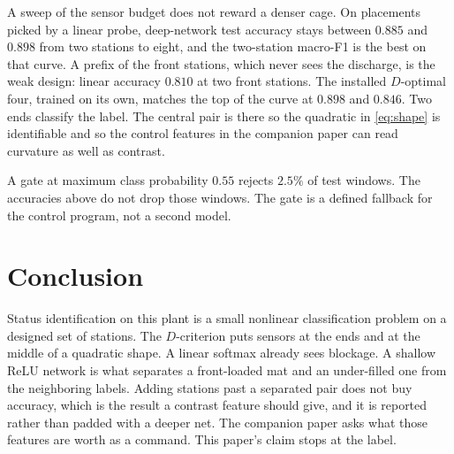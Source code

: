 \documentclass[11pt,a4paper]{article}
\begin{document}
A sweep of the sensor budget does not reward a denser cage. On placements picked by a linear probe, deep-network test accuracy stays between \(0.885\) and \(0.898\) from two stations to eight, and the two-station macro-F1 is the best on that curve. A prefix of the front stations, which never sees the discharge, is the weak design: linear accuracy \(0.810\) at two front stations. The installed \(D\)-optimal four, trained on its own, matches the top of the curve at \(0.898\) and \(0.846\). Two ends classify the label. The central pair is there so the quadratic in \eqref{eq:shape} is identifiable and so the control features in the companion paper can read curvature as well as contrast.

A gate at maximum class probability \(0.55\) rejects \(2.5\%\) of test windows. The accuracies above do not drop those windows. The gate is a defined fallback for the control program, not a second model.

\section{Conclusion}

Status identification on this plant is a small nonlinear classification problem on a designed set of stations. The \(D\)-criterion puts sensors at the ends and at the middle of a quadratic shape. A linear softmax already sees blockage. A shallow ReLU network is what separates a front-loaded mat and an under-filled one from the neighboring labels. Adding stations past a separated pair does not buy accuracy, which is the result a contrast feature should give, and it is reported rather than padded with a deeper net. The companion paper asks what those features are worth as a command. This paper's claim stops at the label.
\end{document}
